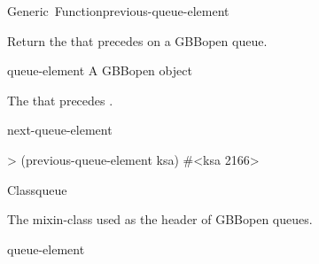 \documentclass[10pt,twoside,english,pdftex]{article}
\begin{document}

\begin{functiondoc}{Generic~Function}{previous-queue-element}%
  {
    \returns{} }
%

\fnsyntax

\fnpurpose Return the  that precedes
 on a GBBopen queue.

\fnmethods
{}%
  {\code{(} 
  \returns{} }

\fnpackage {}

\fnmodule {}

\fnargs
\begin{args}{queue-element}
 A GBBopen  object
\end{args}

\fnreturns The  that precedes
. 
  
\begin{alsos}{next-queue-element}
\end{alsos}

\fnexample
\begin{example}
> (previous-queue-element ksa)
#<ksa 2166>
\end{example}

\end{functiondoc}


\begin{functiondoc}{Class}{queue}{}
%
  
\fnsyntax

\fnpackage {}

\fnmodule {}

\fndescription The mixin-class used as the header of GBBopen queues.

\begin{alsos}{queue-element}
\end{alsos}

\end{functiondoc}
\end{document}
